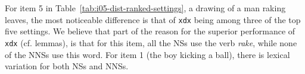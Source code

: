 \documentclass[11pt,letterpaper]{article}
\newcommand{\param}[1]{\texttt{#1}}
\begin{document}
For item 5 in Table~\ref{tab:i05-dist-ranked-settings}, a drawing of a
man raking leaves, the most noticeable difference is that
of \param{xdx} being among three of the top five settings.
We believe that part of the reason for
the superior performance of \param{xdx} (cf. lemmas), is that for this
item, all the NSs use the verb \textit{rake}, while none of the NNSs use this word.  For item 1 (the boy kicking a ball), there is lexical variation
for both NSs and NNSs.
%
\end{document}
